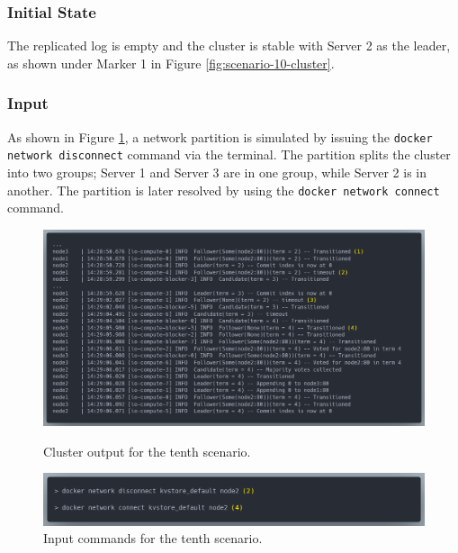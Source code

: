 \subsubsection{Initial State}

The replicated log is empty and the cluster is stable with Server 2 as the leader, as shown under Marker 1 in Figure \ref{fig:scenario-10-cluster}.

\subsubsection{Input}

As shown in Figure \ref{fig:scenario-10-commands}, a network partition is simulated by issuing the \lstinline|docker network disconnect| command via the terminal. The partition splits the cluster into two groups; Server 1 and Server 3 are in one group, while Server 2 is in another. The partition is later resolved by using the \lstinline|docker network connect| command.

\begin{figure}[!ht]
\centering
\includegraphics[width=500pt]{images/scenario_10_cluster.png}
\caption{Cluster output for the tenth scenario.}
\label{fig:scenario-10-cluster}
\includegraphics[width=500pt]{images/scenario_10_commands.png}
\caption{Input commands for the tenth scenario.}
\label{fig:scenario-10-commands}
\end{figure}

